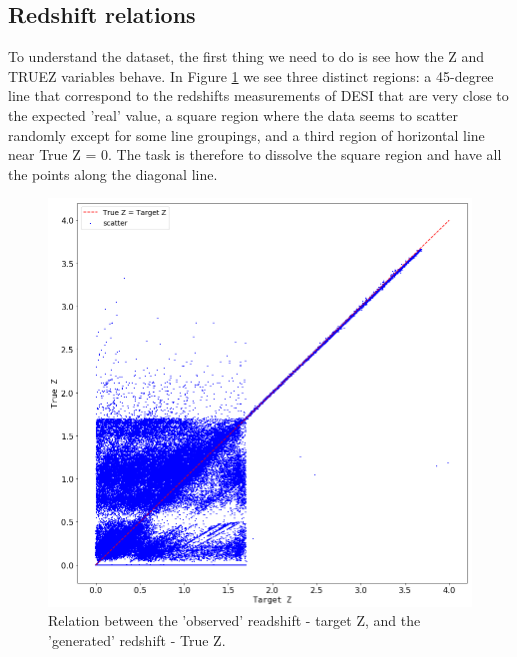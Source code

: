 \subsection{Redshift relations}
To understand the dataset, the first thing we need to do is see how the Z and TRUEZ variables behave. In Figure \ref{fig:z-truez} we see three distinct regions: a 45-degree line that correspond to the redshifts measurements of DESI that are very close to the expected 'real' value, a square region where the data seems to scatter randomly except for some line groupings, and a third region of horizontal line near True Z = 0. The task is therefore to dissolve the square region and have all the points along the diagonal line.   
\begin{figure}[h!]
	\centering
	\includegraphics[width=1.0\linewidth]{TeX_files/Imagenes/z-truez}
	\caption{Relation between the 'observed' readshift - target Z, and the 'generated' redshift - True Z.}
	\label{fig:z-truez}
\end{figure}

